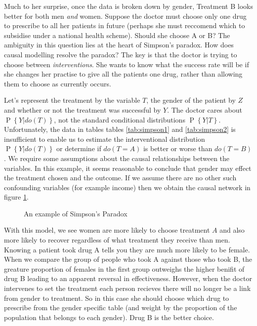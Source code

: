 \documentclass[11pt,a4paper,oneside]{book}
\renewcommand{\P}[1]{\operatorname{P}\left\{#1\right\}}
\theoremstyle{plain}
\theoremstyle{definition}
\begin{document}
Much to her surprise, once the data is broken down by gender, Treatment B looks better for both men \emph{and} women. Suppose the doctor must choose only one drug to prescribe to all her patients in future (perhaps she must reccomend which to subsidise under a national health scheme). Should she choose A or B? The ambiguity in this question lies at the heart of Simpson's paradox. How does causal modelling resolve the paradox? The key is that the doctor is trying to choose between \emph{interventions}. She wants to know what the success rate will be if she changes her practise to give all the patients one drug, rather than allowing them to choose as currently occurs. 

Let's represent the treatment by the variable $T$, the gender of the patient by $Z$ and whether or not the treatment was successful by $Y$. The doctor cares about $\P{Y|do(T)}$, not the standard conditional distributions $\P{Y|T}$. Unfortunately, the data in tables tables \ref{tab:simpson1} and \ref{tab:simpson2} is insufficient to enable us to estimate the interventional distribution $\P{Y|do(T)}$ or determine if $do(T=A)$ is better or worse than $do(T=B)$. We require some assumptions about the causal relationships between the variables. In this example, it seems reasonable to conclude that gender may effect the treatment chosen and the outcome. If we assume there are no other such confounding variables (for example income) then we obtain the causal network in figure \ref{fig:simpsons_paradox}.


\begin{figure}[h]
\caption{An example of Simpson's Paradox}
\label{fig:simpsons_paradox}
\centering
{}
\end{figure}

With this model, we see women are more likely to choose treatment $A$ and also more likely to recover regardless of what treatment they receive than men. Knowing a patient took drug A tells you they are much more likely to be female. When we compare the group of people who took A against those who took B, the greature proportion of females in the first group outweighs the higher benifit of drug B leading to an apparent reversal in effectiveness. However, when the doctor intervenes to set the treatment each person recieves there will no longer be a link from gender to treatment. So in this case she should choose which drug to prescribe from the gender specific table (and weight by the proportion of the population that belongs to each gender). Drug B is the better choice. 
\end{document}
